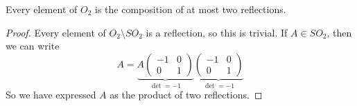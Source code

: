 \documentclass{article}
\begin{document}
\begin{corollary}
    Every element of $O_2$ is the composition of at most two reflections.
\end{corollary}
\begin{proof}
    Every element of $O_2 \setminus SO_2$ is a reflection, so this is trivial. If $A \in SO_2$, then we can write
    \[ A = \underbrace{A \begin{pmatrix}
                -1 & 0 \\ 0 & 1
            \end{pmatrix}}_{\det = -1} \underbrace{\begin{pmatrix}
                -1 & 0 \\ 0 & 1
            \end{pmatrix}}_{\det = -1} \]
    So we have expressed $A$ as the product of two reflections.
\end{proof}
\end{document}
